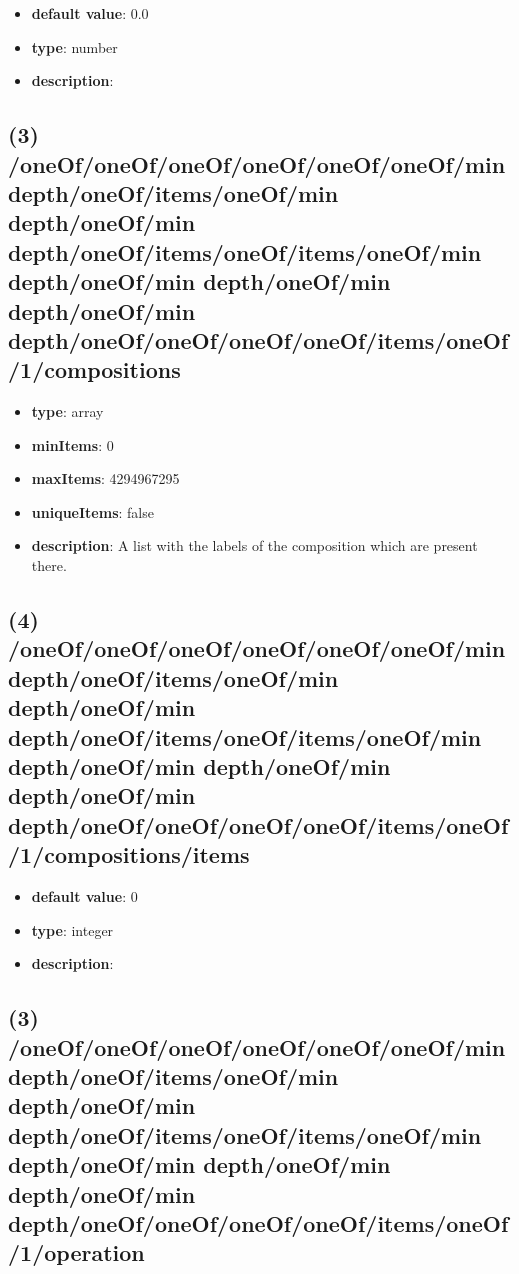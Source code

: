 \begin{itemize}[leftmargin=4em]\item {\bf default value}: 0.0
\item {\bf type}: number
\item {\bf description}: 
\end{itemize}\subsection{(3) /oneOf/oneOf/oneOf/oneOf/oneOf/oneOf/min depth/oneOf/items/oneOf/min depth/oneOf/min depth/oneOf/items/oneOf/items/oneOf/min depth/oneOf/min depth/oneOf/min depth/oneOf/min depth/oneOf/oneOf/oneOf/oneOf/items/oneOf/1/compositions}
\begin{itemize}[leftmargin=3em]\item {\bf type}: array
\item {\bf minItems}: 0
\item {\bf maxItems}: 4294967295
\item {\bf uniqueItems}: false
\item {\bf description}: A list with the labels of the composition which are present there.
\end{itemize}\subsection{(4) /oneOf/oneOf/oneOf/oneOf/oneOf/oneOf/min depth/oneOf/items/oneOf/min depth/oneOf/min depth/oneOf/items/oneOf/items/oneOf/min depth/oneOf/min depth/oneOf/min depth/oneOf/min depth/oneOf/oneOf/oneOf/oneOf/items/oneOf/1/compositions/items}
\begin{itemize}[leftmargin=4em]\item {\bf default value}: 0
\item {\bf type}: integer
\item {\bf description}: 
\end{itemize}\subsection{(3) /oneOf/oneOf/oneOf/oneOf/oneOf/oneOf/min depth/oneOf/items/oneOf/min depth/oneOf/min depth/oneOf/items/oneOf/items/oneOf/min depth/oneOf/min depth/oneOf/min depth/oneOf/min depth/oneOf/oneOf/oneOf/oneOf/items/oneOf/1/operation}
